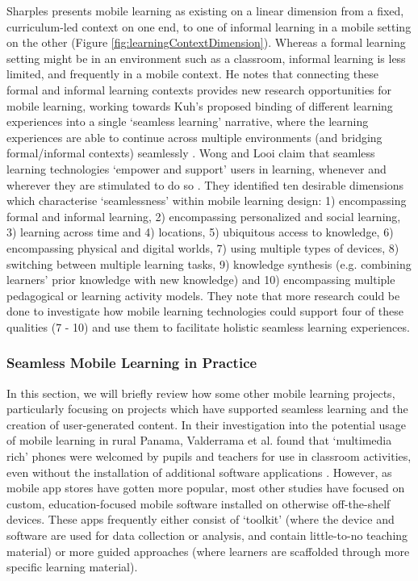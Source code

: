 Sharples presents mobile learning as existing on a linear dimension from a fixed, curriculum-led context on one end, to one of informal learning in a mobile setting on the other \citep{Sharples2013} (Figure \ref{fig:learningContextDimension}). Whereas a formal learning setting might be in an environment such as a classroom, informal learning is less limited, and frequently in a mobile context. He notes that connecting these formal and informal learning contexts provides new research opportunities for mobile learning, working towards Kuh’s proposed binding of different learning experiences into a single ‘seamless learning’ narrative, where the learning experiences are able to continue across multiple environments (and bridging formal/informal contexts) seamlessly \citep{Kuh1996}. Wong and Looi claim that seamless learning technologies ‘empower and support’ users in learning, whenever and wherever they are stimulated to do so \citep{Wong2011}. They identified ten desirable dimensions which characterise ‘seamlessness’ within mobile learning design: 1) encompassing formal and informal learning, 2) encompassing personalized and social learning, 3) learning across time and 4) locations, 5) ubiquitous access to knowledge, 6) encompassing physical and digital worlds, 7) using multiple types of devices, 8) switching between multiple learning tasks, 9) knowledge synthesis (e.g. combining learners’ prior knowledge with new knowledge) and 10) encompassing multiple pedagogical or learning activity models. They note that more research could be done to investigate how mobile learning technologies could support four of these qualities (7 - 10) and use them to facilitate holistic seamless learning experiences. 

\subsubsection{Seamless Mobile Learning in Practice}
In this section, we will briefly review how some other mobile learning projects, particularly focusing on projects which have supported seamless learning and the creation of user-generated content. In their investigation into the potential usage of mobile learning in rural Panama, Valderrama et al. found that ‘multimedia rich’ phones were welcomed by pupils and teachers for use in classroom activities, even without the installation of additional software applications \citep{ValderramaBahamondez2011}. However, as mobile app stores have gotten more popular, most other studies have focused on custom, education-focused mobile software installed on otherwise off-the-shelf devices. These apps frequently either consist of `toolkit' (where the device and software are used for data collection or analysis, and contain little-to-no teaching material) or more guided approaches (where learners are scaffolded through more specific learning material). 

